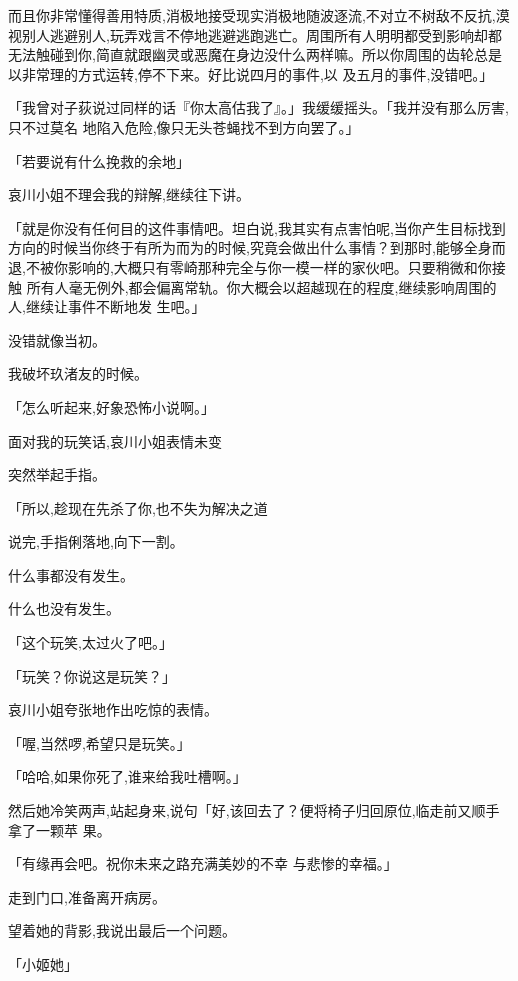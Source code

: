 \documentclass{article}
\begin{document}
\newpage

而且你非常懂得善用特质,消极地接受现实消极地随波逐流,不对立不树敌不反抗,漠视别人逃避别人,玩弄戏言不停地逃避逃跑逃亡。周围所有人明明都受到影响却都无法触碰到你,简直就跟幽灵或恶魔在身边没什么两样嘛。所以你周围的齿轮总是以非常理的方式运转,停不下来。好比说四月的事件,以
及五月的事件,没错吧。」 

「我曾对子荻说过同样的话『你太高估我了』。」我缓缓摇头。「我并没有那么厉害,只不过莫名
地陷入危险,像只无头苍蝇找不到方向罢了。」 


「若要说有什么挽救的余地」 


哀川小姐不理会我的辩解,继续往下讲。 

「就是你没有任何目的这件事情吧。坦白说,我其实有点害怕呢,当你产生目标找到方向的时候当你终于有所为而为的时候,究竟会做出什么事情？到那时,能够全身而退,不被你影响的,大概只有零崎那种完全与你一模一样的家伙吧。只要稍微和你接触
\newpage
所有人毫无例外,都会偏离常轨。你大概会以超越现在的程度,继续影响周围的人,继续让事件不断地发
生吧。」 


没错就像当初。 


我破坏玖渚友的时候。 


「怎么听起来,好象恐怖小说啊。」 


面对我的玩笑话,哀川小姐表情未变 


突然举起手指。 

「所以,趁现在先杀了你,也不失为解决之道


说完,手指俐落地,向下一割。 



什么事都没有发生。 

\newpage


什么也没有发生。 


「这个玩笑,太过火了吧。」 


「玩笑？你说这是玩笑？」 


哀川小姐夸张地作出吃惊的表情。 


「喔,当然啰,希望只是玩笑。」 


「哈哈,如果你死了,谁来给我吐槽啊。」 

然后她冷笑两声,站起身来,说句「好,该回去了？便将椅子归回原位,临走前又顺手拿了一颗苹
果。 

「有缘再会吧。祝你未来之路充满美妙的不幸
与悲惨的幸福。」 


走到门口,准备离开病房。 

\newpage


望着她的背影,我说出最后一个问题。 


「小姬她」 
\end{document}
